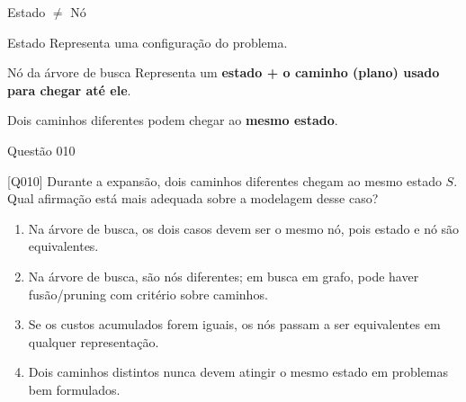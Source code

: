 \documentclass[xcolor=dvipsnames,table]{beamer}
\begin{document}
\begin{frame}{Estado $\neq$ Nó}
\begin{block}{Estado}
Representa uma configuração do problema.
\end{block}\pause

\begin{block}{Nó da árvore de busca}
    Representa um {\color{blue}\bf estado + o caminho (plano) usado para chegar até ele}.
\end{block}\pause

\begin{center}
    Dois caminhos diferentes podem chegar ao {\color{blue}\bf mesmo estado}.
\end{center}

\end{frame}

\begin{frame}{Questão 010}

\begin{block}{[Q010]}
Durante a expansão, dois caminhos diferentes chegam ao mesmo estado $S$. Qual afirmação está mais adequada sobre a modelagem desse caso?
\end{block}

\begin{enumerate}[label=(\Alph*)]
    \item Na árvore de busca, os dois casos devem ser o mesmo nó, pois estado e nó são equivalentes.
    
    \item Na árvore de busca, são nós diferentes; em busca em grafo, pode haver fusão/pruning com critério sobre caminhos.
    
    \item Se os custos acumulados forem iguais, os nós passam a ser equivalentes em qualquer representação.
    
    \item Dois caminhos distintos nunca devem atingir o mesmo estado em problemas bem formulados.
\end{enumerate}

\end{frame}
\end{document}
